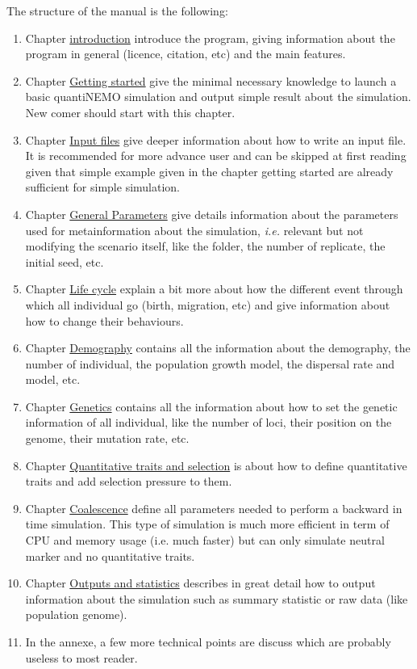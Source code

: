 \documentclass[letterpaper,12pt,oneside]{book}
\begin{document}
The structure of the manual is the following:
\begin{enumerate}
\item Chapter \hyperref[chap:introduction]{introduction} introduce the program, giving information about the program in general (licence, citation, etc) and the main features. 
\item Chapter \hyperref[chap:GettingStarted] {Getting started} give the minimal necessary knowledge to launch a basic quantiNEMO simulation and output simple result about the simulation. New comer should start with this chapter. 
\item Chapter \hyperref[chap:InputFiles]{Input files} give deeper information about how to write an input file. It is recommended for more advance user and can be skipped at first reading given that simple example given in the chapter getting started are already sufficient for simple simulation. 
\item Chapter \hyperref[chap:GeneralParameters]{General Parameters} give details information about the parameters used for metainformation about the simulation, \textit{i.e.} relevant but not modifying the scenario itself, like the folder, the number of replicate, the initial seed, etc. 
\item Chapter \hyperref[chap:LifeCycle]{Life cycle} explain a bit more about how the different event through which all individual go (birth, migration, etc) and give information about how to change their behaviours. 
\item Chapter \hyperref[chap:Demography]{Demography} contains all the information about the demography, the number of individual, the population growth model, the dispersal rate and model, etc. 
\item Chapter \hyperref[chap:Genetics]{Genetics} contains all the information about how to set the genetic information of all individual, like the number of loci, their position on the genome, their mutation rate, etc. 
\item Chapter \hyperref[chap:QuantitativeTraitsAndSelection]{Quantitative traits and selection} is about how to define quantitative traits and add selection pressure to them. 
\item Chapter \hyperref[chap:Coalescence]{Coalescence} define all parameters needed to perform a backward in time simulation. This type of simulation is much more efficient in term of CPU and memory usage (i.e. much faster) but can only simulate neutral marker and no quantitative traits.
\item Chapter \hyperref[chap:OutputsAndStatistics]{Outputs and statistics} describes in great detail how to output information about the  simulation such as summary statistic or raw data (like population genome).  
\item In the annexe, a few more technical points are discuss which are probably useless to most reader. 
\end{enumerate}
\end{document}
